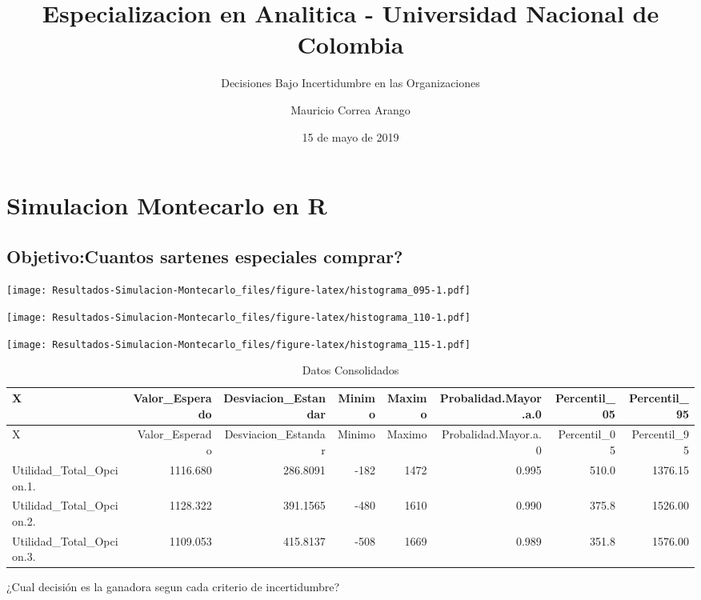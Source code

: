 \documentclass[]{article}
\title{Especializacion en Analitica - Universidad Nacional de Colombia}
\subtitle{Decisiones Bajo Incertidumbre en las Organizaciones}
\author{Mauricio Correa Arango}
\date{15 de mayo de 2019}
\begin{document}
\maketitle

\section{Simulacion Montecarlo en R}\label{simulacion-montecarlo-en-r}

\subsection{Objetivo:Cuantos sartenes especiales
comprar?}\label{objetivocuantos-sartenes-especiales-comprar}

\texttt{[image: Resultados-Simulacion-Montecarlo\_files/figure-latex/histograma\_095-1.pdf]}

\texttt{[image: Resultados-Simulacion-Montecarlo\_files/figure-latex/histograma\_110-1.pdf]}

\texttt{[image: Resultados-Simulacion-Montecarlo\_files/figure-latex/histograma\_115-1.pdf]}

\begin{longtable}[]{@{}lrrrrrrr@{}}
\caption{Datos Consolidados}\tabularnewline
\toprule
X & Valor\_Esperado & Desviacion\_Estandar & Minimo & Maximo &
Probalidad.Mayor.a.0 & Percentil\_05 & Percentil\_95\tabularnewline
\midrule
\endfirsthead
\toprule
X & Valor\_Esperado & Desviacion\_Estandar & Minimo & Maximo &
Probalidad.Mayor.a.0 & Percentil\_05 & Percentil\_95\tabularnewline
\midrule
\endhead
Utilidad\_Total\_Opcion.1. & 1116.680 & 286.8091 & -182 & 1472 & 0.995 &
510.0 & 1376.15\tabularnewline
Utilidad\_Total\_Opcion.2. & 1128.322 & 391.1565 & -480 & 1610 & 0.990 &
375.8 & 1526.00\tabularnewline
Utilidad\_Total\_Opcion.3. & 1109.053 & 415.8137 & -508 & 1669 & 0.989 &
351.8 & 1576.00\tabularnewline
\bottomrule
\end{longtable}

¿Cual decisión es la ganadora segun cada criterio de incertidumbre?
\end{document}
